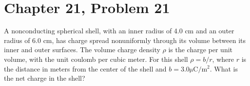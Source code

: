 \documentclass[12pt]{article}
\begin{document}
\pagebreak
\section{Chapter 21, Problem 21}
A nonconducting spherical shell, with an inner radius of 4.0 cm and an outer radius of 6.0 cm, has charge spread nonuniformly through its volume between its inner and outer surfaces. The volume charge density $\rho$ is the charge per unit volume, with the unit coulomb per cubic meter. For this shell $\rho = b/r$, where $r$ is the distance in meters from the center of the shell
and $b = 3.0 \unit{\micro\coulomb/\meter^2}$. What is the net charge in the shell?
\end{document}
